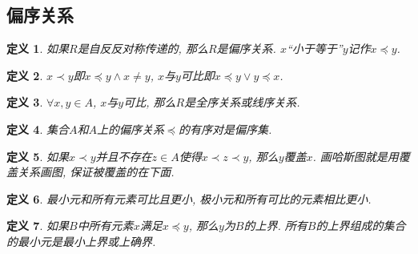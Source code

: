 \documentclass[UTF8,a4paper,11pt]{ctexart}
\newtheorem{definition}{定义}
\begin{document}
    \subsection{偏序关系}
      \begin{definition}
        如果$R$是自反反对称传递的, 那么$R$是偏序关系.
        $x$``小于等于''$y$记作$x\preccurlyeq y$.
      \end{definition}
      \begin{definition}
        $x\prec y$即$x\preccurlyeq y\wedge x\neq y$,
        $x$与$y$可比即$x\preccurlyeq y\vee y\preccurlyeq x$.
      \end{definition}
      \begin{definition}
        $\forall x,y\in A$, $x$与$y$可比, 那么$R$是全序关系或线序关系.
      \end{definition}
      \begin{definition}
        集合$A$和$A$上的偏序关系$\preccurlyeq $的有序对是偏序集.
      \end{definition}
      \begin{definition}
        如果$x\prec y$并且不存在$z\in A$使得$x\prec z\prec y$,
        那么$y$覆盖$x$.
        画哈斯图就是用覆盖关系画图, 保证被覆盖的在下面.
      \end{definition}
      \begin{definition}
        最小元和所有元素可比且更小,
        极小元和所有可比的元素相比更小.
      \end{definition}
      \begin{definition}
        如果$B$中所有元素$x$满足$x\preccurlyeq y$,
        那么$y$为$B$的上界.
        所有$B$的上界组成的集合的最小元是最小上界或上确界.
      \end{definition}
\end{document}
